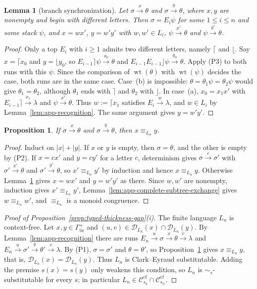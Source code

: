 \documentclass[11pt,a4paper]{article}
\newtheorem{lemma}[theorem]{Lemma}
\newtheorem{proposition}[theorem]{Proposition}
\theoremstyle{remark}
\theoremstyle{plain}
\newcommand{\D}{\mathcal{D}}
\newcommand{\cf}{\mathrm{cf}}
\newcommand{\Ccf}[1]{\mathcal C_{#1}^{\cf}}
\begin{document}
\begin{lemma}[branch synchronization]\label{lem:app-branch-synchronization}
Let $\sigma\xrightarrow{x}\theta$ and $\sigma\xrightarrow{y}\theta$,
where $x,y$ are nonempty and begin with different letters. Then
$\sigma=E_i\psi$ for some $1\le i\le n$ and some stack $\psi$, and
$x=wx'$, $y=w'y'$ with $w,w'\in L_i$,
$\psi\xrightarrow{x'}\theta$ and $\psi\xrightarrow{y'}\theta$.
\end{lemma}
\begin{proof}
Only a top $E_i$ with $i\ge1$ admits two different letters, namely
$\lceil$ and $\lfloor$. Say $x=\lceil x_0$ and $y=\lfloor y_0$, so
$E_{i-1}\rceil\psi\xrightarrow{x_0}\theta$ and
$E_{i-1}E_{i-1}\rfloor\psi\xrightarrow{y_0}\theta$. Apply (P3) to both
runs with this $\psi$. Since the comparison of
$\operatorname{wt}(\theta)$ with $\operatorname{wt}(\psi)$ decides the
case, both runs are in the same case. Case~(b) is impossible:
$\theta=\theta_1\psi=\theta_2\psi$ would give $\theta_1=\theta_2$,
although $\theta_1$ ends with $\rceil$ and $\theta_2$ with $\rfloor$.
In case~(a), $x_0=x_1x'$ with $E_{i-1}\rceil\xrightarrow{x_1}\lambda$
and $\psi\xrightarrow{x'}\theta$. Thus $w:=\lceil x_1$ satisfies
$E_i\xrightarrow{w}\lambda$, and $w\in L_i$ by
Lemma~\ref{lem:app-recognition}. The same argument gives $y=w'y'$.
\end{proof}

\begin{proposition}\label{prop:app-path-congruence}
If $\sigma\xrightarrow{x}\theta$ and $\sigma\xrightarrow{y}\theta$, then
$x\equiv_{L_n}y$.
\end{proposition}
\begin{proof}
Induct on $|x|+|y|$. If $x$ or $y$ is empty, then $\sigma=\theta$, and
the other is empty by (P2). If $x=cx'$ and $y=cy'$ for a letter $c$,
determinism gives $\sigma\xrightarrow{c}\sigma'$ with
$\sigma'\xrightarrow{x'}\theta$ and $\sigma'\xrightarrow{y'}\theta$, so
$x'\equiv_{L_n}y'$ by induction and hence $x\equiv_{L_n}y$. Otherwise
Lemma~\ref{lem:app-branch-synchronization} gives $x=wx'$ and $y=w'y'$
as there. Since $w,w'$ are nonempty, induction gives
$x'\equiv_{L_n}y'$, Lemma~\ref{lem:app-complete-subtree-exchange} gives
$w\equiv_{L_n}w'$, and $\equiv_{L_n}$ is a monoid congruence.
\end{proof}

\begin{proof}[Proof of Proposition~\ref{prop:typed-thickness-gap}(i)]
The finite language $L_n$ is context-free. Let
$x,y\in\Gamma_{\mathrm{br}}^+$ and
$(u,v)\in\D_{L_n}(x)\cap\D_{L_n}(y)$. By
Lemma~\ref{lem:app-recognition} there are runs
$E_n\xrightarrow{u}\sigma\xrightarrow{x}\theta\xrightarrow{v}\lambda$
and
$E_n\xrightarrow{u}\sigma'\xrightarrow{y}\theta'\xrightarrow{v}\lambda$.
By (P1), $\sigma=\sigma'$ and $\theta=\theta'$, so
Proposition~\ref{prop:app-path-congruence} gives $x\equiv_{L_n}y$, that
is, $\D_{L_n}(x)=\D_{L_n}(y)$. Thus $L_n$ is Clark--Eyraud
substitutable. Adding the premise $s(x)=s(y)$ only weakens this
condition, so $L_n$ is $\sim_s$-substitutable for every $s$; in
particular $L_n\in\Ccf{s_0}\cap\Ccf{s_{\mathrm U}}$.
\end{proof}
\end{document}
